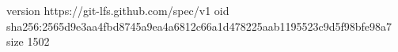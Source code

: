 version https://git-lfs.github.com/spec/v1
oid sha256:2565d9e3aa4fbd8745a9ea4a6812c66a1d478225aab1195523c9d5f98bfe98a7
size 1502
